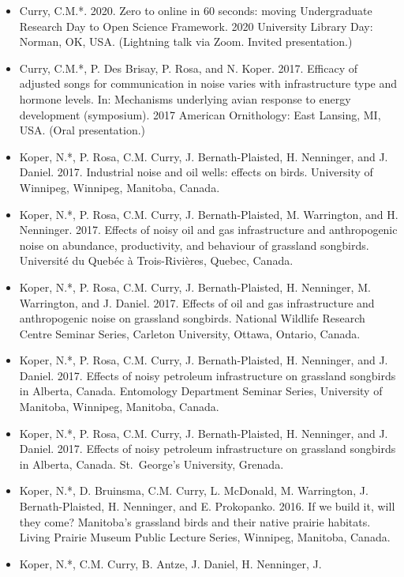 \documentclass[
  letterpaper,
  DIV=11,
  numbers=noendperiod,
  oneside]{scrreprt}
\providecommand{\tightlist}{%
  \setlength{\itemsep}{0pt}\setlength{\parskip}{0pt}}\usepackage{longtable,booktabs,array}
\begin{document}
\begin{itemize}
\tightlist
\item
  Curry, C.M.*. 2020. Zero to online in 60 seconds: moving Undergraduate
  Research Day to Open Science Framework. 2020 University Library Day:
  Norman, OK, USA. (Lightning talk via Zoom. Invited presentation.)
\item
  Curry, C.M.*, P. Des Brisay, P. Rosa, and N. Koper. 2017. Efficacy of
  adjusted songs for communication in noise varies with infrastructure
  type and hormone levels. In: Mechanisms underlying avian response to
  energy development (symposium). 2017 American Ornithology: East
  Lansing, MI, USA. (Oral presentation.)
\item
  Koper, N.*, P. Rosa, C.M. Curry, J. Bernath-Plaisted, H. Nenninger,
  and J. Daniel. 2017. Industrial noise and oil wells: effects on birds.
  University of Winnipeg, Winnipeg, Manitoba, Canada.
\item
  Koper, N.*, P. Rosa, C.M. Curry, J. Bernath-Plaisted, M. Warrington,
  and H. Nenninger. 2017. Effects of noisy oil and gas infrastructure
  and anthropogenic noise on abundance, productivity, and behaviour of
  grassland songbirds. Université du Quebéc à Trois-Rivières, Quebec,
  Canada.
\item
  Koper, N.*, P. Rosa, C.M. Curry, J. Bernath-Plaisted, H. Nenninger, M.
  Warrington, and J. Daniel. 2017. Effects of oil and gas infrastructure
  and anthropogenic noise on grassland songbirds. National Wildlife
  Research Centre Seminar Series, Carleton University, Ottawa, Ontario,
  Canada.
\item
  Koper, N.*, P. Rosa, C.M. Curry, J. Bernath-Plaisted, H. Nenninger,
  and J. Daniel. 2017. Effects of noisy petroleum infrastructure on
  grassland songbirds in Alberta, Canada. Entomology Department Seminar
  Series, University of Manitoba, Winnipeg, Manitoba, Canada.
\item
  Koper, N.*, P. Rosa, C.M. Curry, J. Bernath-Plaisted, H. Nenninger,
  and J. Daniel. 2017. Effects of noisy petroleum infrastructure on
  grassland songbirds in Alberta, Canada. St.~George's University,
  Grenada.
\item
  Koper, N.*, D. Bruinsma, C.M. Curry, L. McDonald, M. Warrington, J.
  Bernath-Plaisted, H. Nenninger, and E. Prokopanko. 2016. If we build
  it, will they come? Manitoba's grassland birds and their native
  prairie habitats. Living Prairie Museum Public Lecture Series,
  Winnipeg, Manitoba, Canada.
\item
  Koper, N.*, C.M. Curry, B. Antze, J. Daniel, H. Nenninger, J.

\end{itemize}
\end{document}

